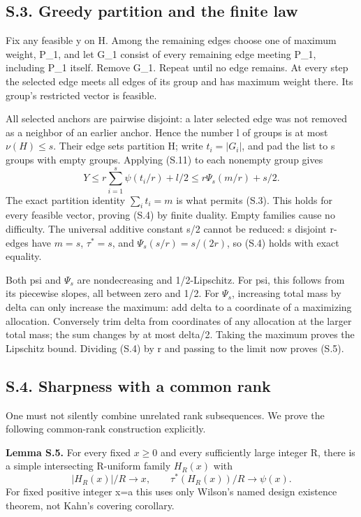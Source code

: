 \documentclass[
  11pt,
]{article}
\begin{document}
\subsection{S.3. Greedy partition and the finite
law}\label{s.3.-greedy-partition-and-the-finite-law}

Fix any feasible y on H. Among the remaining edges choose one of maximum
weight, P\_1, and let G\_1 consist of every remaining edge meeting P\_1,
including P\_1 itself. Remove G\_1. Repeat until no edge remains. At
every step the selected edge meets all edges of its group and has
maximum weight there. Its group's restricted vector is feasible.

All selected anchors are pairwise disjoint: a later selected edge was
not removed as a neighbor of an earlier anchor. Hence the number l of
groups is at most \(\nu(H)\le s\). Their edge sets partition H; write
\(t_i=|G_i|\), and pad the list to s groups with empty groups. Applying
(S.11) to each nonempty group gives \[
 Y\le r\sum_{i=1}^s\psi(t_i/r)+l/2
       \le r\Psi_s(m/r)+s/2.
\] The exact partition identity \(\sum_i t_i=m\) is what permits (S.3).
This holds for every feasible vector, proving (S.4) by finite duality.
Empty families cause no difficulty. The universal additive constant s/2
cannot be reduced: s disjoint r-edges have \(m=s\), \(\tau^*=s\), and
\(\Psi_s(s/r)=s/(2r)\), so (S.4) holds with exact equality.

Both psi and \(\Psi_s\) are nondecreasing and 1/2-Lipschitz. For psi,
this follows from its piecewise slopes, all between zero and 1/2. For
\(\Psi_s\), increasing total mass by delta can only increase the
maximum: add delta to a coordinate of a maximizing allocation.
Conversely trim delta from coordinates of any allocation at the larger
total mass; the sum changes by at most delta/2. Taking the maximum
proves the Lipschitz bound. Dividing (S.4) by r and passing to the limit
now proves (S.5).

\subsection{S.4. Sharpness with a common
rank}\label{s.4.-sharpness-with-a-common-rank}

One must not silently combine unrelated rank subsequences. We prove the
following common-rank construction explicitly.

\textbf{Lemma S.5.} For every fixed \(x\ge0\) and every sufficiently
large integer R, there is a simple intersecting R-uniform family
\(H_R(x)\) with \[
            |H_R(x)|/R\to x,\qquad
            \tau^*(H_R(x))/R\to\psi(x).                   \tag{S.12}
\] For fixed positive integer x=a this uses only Wilson's named design
existence theorem, not Kahn's covering corollary.
\end{document}
